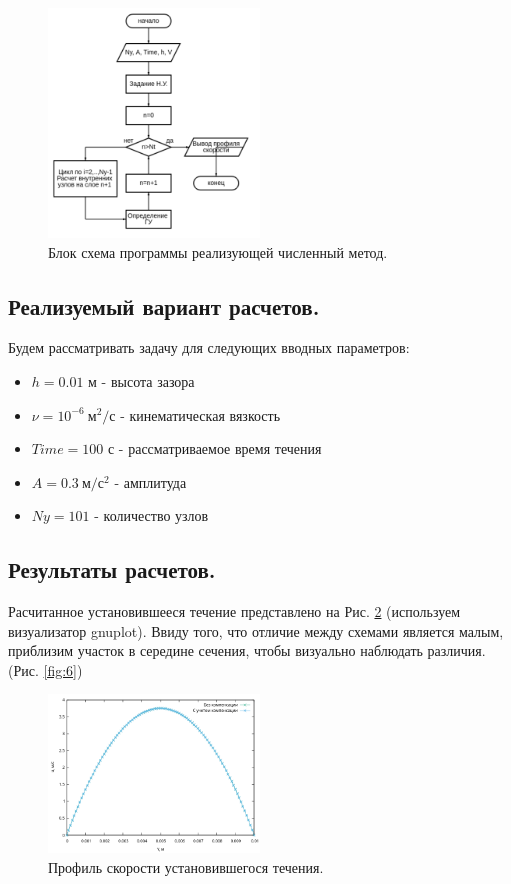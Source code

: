 \begin{figure}[H]
    \centering
    \includegraphics[width=0.5\textwidth]{images/4.png}
    \caption {Блок схема программы реализующей численный метод.}
    \label{fig:4}
\end{figure}

\subsection{Реализуемый вариант расчетов.}
Будем рассматривать задачу для следующих вводных параметров:
\begin{itemize}
    \item $h=0.01$ м - высота зазора
    \item $\nu = 10^{-6}~ \text{м}^2/\text{с}$  - кинематическая вязкость
    \item $Time = 100$ с - рассматриваемое время течения
    \item $A=0.3 ~\text{м}/\text{с}^2$ - амплитуда
    \item $Ny = 101$ - количество узлов
\end{itemize}

\subsection{Результаты расчетов.}
Расчитанное установившееся течение представлено на Рис. \ref{fig:5} (используем визуализатор gnuplot).
Ввиду того, что отличие между схемами является малым, приблизим участок в середине сечения, чтобы визуально наблюдать различия. (Рис. \ref{fig:6})
\begin{figure}[H]
    \centering
    \includegraphics[width=0.5\textwidth]{images/5.png}
    \caption {Профиль скорости установившегося течения.}
    \label{fig:5}
\end{figure}

